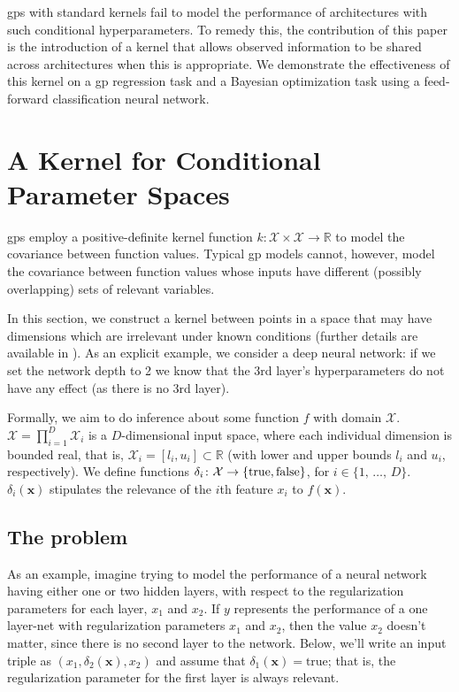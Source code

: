 \documentclass{article}
\renewcommand{\vec}[1]{\mathbf{#1}}
\newcommand{\reals}{\mathds{R}}
\newcommand{\sX}{\mathcal{X}}
\newcommand{\gp}{{\sc gp}}
\begin{document}
\gp s with standard kernels fail to model the performance of architectures with such conditional hyperparameters.
To remedy this, the contribution of this paper is the introduction of a kernel that allows observed information to be shared across architectures when this is appropriate.
We demonstrate the effectiveness of this kernel on a \gp{} regression task and a Bayesian optimization task using a feed-forward classification neural network. 


\section{A Kernel for Conditional Parameter Spaces}
\vspace{-0.05in} 

\gp{}s employ a positive-definite kernel function $k: \sX \times \sX \rightarrow \mathbb{R}$ to model the covariance between function values.
Typical \gp{} models cannot, however, model the covariance between function values whose inputs have different (possibly overlapping) sets of relevant variables.

In this section, we construct a kernel between points in a space that may have dimensions which are irrelevant under known conditions (further details are available in \cite{arxiv_hierarchical_kernel}).
As an explicit example, we consider a deep neural network: if we set the network depth to 2 we know that the 3rd layer's hyperparameters do not have any effect (as there is no 3rd layer).

Formally, we aim to do inference about some function $f$ with domain 
 $\sX$. $\sX = \prod_{i=1}^D \sX_i$ is a $D$-dimensional input space, where each individual dimension is bounded real, that is, $\sX_i = [l_i, u_i] \subset \reals$ (with lower and upper bounds $l_i$ and $u_i$, respectively).
We define functions 
$\delta_i\colon \sX\to \{\textnormal{true}, \textnormal{false}\}$,
 for $i \in \{1,\,\ldots,\,D\}$.
  $\delta_i(\vec{x})$ stipulates the relevance of the $i$th feature $x_i$ to  
$f(\vec{x})$.



\subsection{The problem}
\vspace{-0.05in}

As an example, imagine trying to model the performance of a neural network having either one or two hidden layers, with respect to the regularization parameters for each layer, $x_1$ and $x_2$.
If $y$ represents the performance of a one layer-net with regularization parameters $x_1$ and $x_2$, then the value $x_2$ doesn't matter, since there is no second layer to the network.
Below, we'll write an input triple as $(x_1, \delta_2(\vec{x}), x_2)$ and assume that $\delta_1(\vec{x}) = \text{true}$; that is, the regularization parameter for the first layer is always relevant. 
\end{document}
